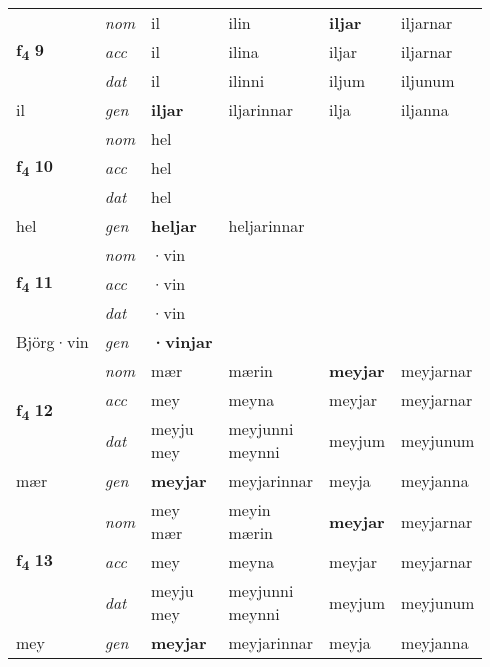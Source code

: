 \begin{longtable}[l]{X>{\footnotesize\itshape}XXXXX}
\multirow{3}{*}{{{\textbf{f{\textsubscript{4}}} \Large{\textbf{9}}}}} & nom & il & ilin & \textbf{iljar} & iljarnar \\*
 & acc & il & ilina & iljar & iljarnar \\*
 & dat & il & ilinni & iljum & iljunum \\*
 {\footnotesize{il}} & gen & \textbf{iljar} & iljarinnar & ilja & iljanna \\
\cmidrule{1-6}

\multirow{3}{*}{{{\textbf{f{\textsubscript{4}}} \Large{\textbf{10}}}}} & nom & hel &  & \textbf{} &  \\*
 & acc & hel &  &  &  \\*
 & dat & hel &  &  &  \\*
 {\footnotesize{hel}} & gen & \textbf{heljar} & heljarinnar &  &  \\
\cmidrule{1-6}

\multirow{3}{*}{{{\textbf{f{\textsubscript{4}}} \Large{\textbf{11}}}}} & nom & ·vin &  & \textbf{} &  \\*
 & acc & ·vin &  &  &  \\*
 & dat & ·vin &  &  &  \\*
 {\footnotesize{Björg\allowbreak ·vin}} & gen & \textbf{·vinjar} &  &  &  \\
\cmidrule{1-6}

\multirow{3}{*}{{{\textbf{f{\textsubscript{4}}} \Large{\textbf{12}}}}} & nom & mær & mærin & \textbf{meyjar} & meyjarnar \\*
 & acc & mey & meyna & meyjar & meyjarnar \\*
 & dat & \specialcell{meyju\\ mey} & \specialcell{meyjunni\\ meynni} & meyjum & meyjunum \\*
 {\footnotesize{mær}} & gen & \textbf{meyjar} & meyjarinnar & meyja & meyjanna \\


\multirow{3}{*}{{{\textbf{f{\textsubscript{4}}} \Large{\textbf{13}}}}} & nom & \specialcell{mey\\ mær} & \specialcell{meyin\\ mærin} & \textbf{meyjar} & meyjarnar \\*
 & acc & mey & meyna & meyjar & meyjarnar \\*
 & dat & \specialcell{meyju\\ mey} & \specialcell{meyjunni\\ meynni} & meyjum & meyjunum \\*
 {\footnotesize{mey}} & gen & \textbf{meyjar} & meyjarinnar & meyja & meyjanna \\
\cmidrule{1-6}


\end{longtable}
